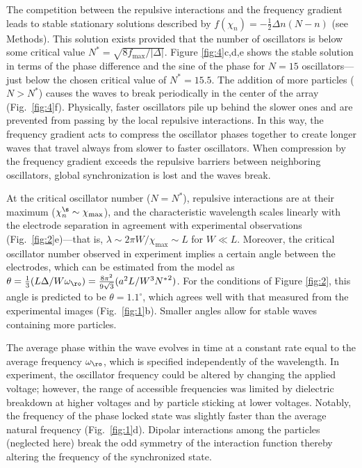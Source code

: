 The competition between the repulsive interactions and the frequency gradient leads to stable stationary solutions described by $f(\chi_n) = -\frac{1}{2}\Delta n(N-n)$ (see Methods). This solution exists provided that the number of oscillators is below some critical value $N^* = \sqrt{8 f_{\max}/\lvert\Delta\rvert}$. Figure \ref{fig:4}c,d,e shows the stable solution in terms of the phase difference and the sine of the phase for $N=15$ oscillators---just below the chosen critical value of $N^*=15.5$. The addition of more particles ($N>N^*$) causes the waves to break periodically in the center of the array (Fig.~\ref{fig:4}f). Physically, faster oscillators pile up behind the slower ones and are prevented from passing by the local repulsive interactions.  In this way, the frequency gradient acts to compress the oscillator phases together to create longer waves that travel always from slower to faster oscillators. When compression by the frequency gradient exceeds the repulsive barriers between neighboring oscillators, global synchronization is lost and the waves break. 

At the critical oscillator number ($N = N^*$), repulsive interactions are at their maximum ($\chi^{\s}_n \sim \chi_{\max}$), and the characteristic wavelength scales linearly with the electrode separation in agreement with experimental observations (Fig.~\ref{fig:2}e)---that is, $\lambda\sim2\pi W/ \chi_{\max} \sim L$ for $W\ll L$.  Moreover, the critical oscillator number observed in experiment implies a certain angle between the electrodes, which can be estimated from the model as $\theta = \tfrac{1}{3}(L\Delta /W \omega_{\ro} ) = \tfrac{8 \pi ^2}{9 \sqrt{3}} (a^2 L/W^3 {N^*}^2)$. For the conditions of Figure \ref{fig:2}, this angle is predicted to be $\theta = 1.1^\circ$, which agrees well with that measured from the experimental images (Fig.~\ref{fig:1}b).  Smaller angles allow for stable waves containing more particles. 

The average phase within the wave evolves in time at a constant rate equal to the average frequency $\omega_{\ro}$, which is specified independently of the wavelength. In experiment, the oscillator frequency could be altered by changing the applied voltage; however, the range of accessible frequencies was limited by dielectric breakdown at higher voltages and by particle sticking at lower voltages\autocite{drews2015contact}. Notably, the frequency of the phase locked state was slightly faster than the average natural frequency (Fig.~\ref{fig:1}d). Dipolar interactions among the particles (neglected here) break the odd symmetry of the interaction function thereby altering the frequency of the synchronized state.


